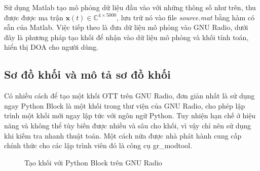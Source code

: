 {Sử dụng Matlab tạo mô phỏng dữ liệu đầu vào với những thông số như trên, thu được được ma trận $\mathbf{x}(t) \in \mathbb{C}^{4 \times 5000}$, lưu trữ nó vào file \textit{source.mat} bằng hàm có sẵn của Matlab. Việc tiếp theo là đưa dữ liệu mô phỏng vào GNU Radio, dưới đây là phương pháp tạo khối để nhận vào dữ liệu mô phỏng và khối tính toán, hiển thị DOA cho người dùng.

\subsection{Sơ đồ khối và mô tả sơ đồ khối}

Có nhiều cách để tạo một khối OTT trên GNU Radio, đơn giản nhất là sử dụng ngay Python Block là một khối trong thư viện của GNU Radio, cho phép lập trình một khối mới ngay lập tức với ngôn ngữ Python. Tuy nhiện hạn chế ở hiệu năng và không thể tùy biến được nhiều và sâu cho khối, vì vậy chỉ nên sử dụng khi kiếm tra nhanh thuật toán. Một cách nữa được nhà phát hành cung cấp chính thức cho các lập trình viên đó là công cụ gr\_modtool.

\begin{figure}[!htb]
{}
\hfill
{}
\hfill
\caption{Tạo khối với Python Block trên GNU Radio}
\label{fig:pythonblock}
\end{figure}

}
